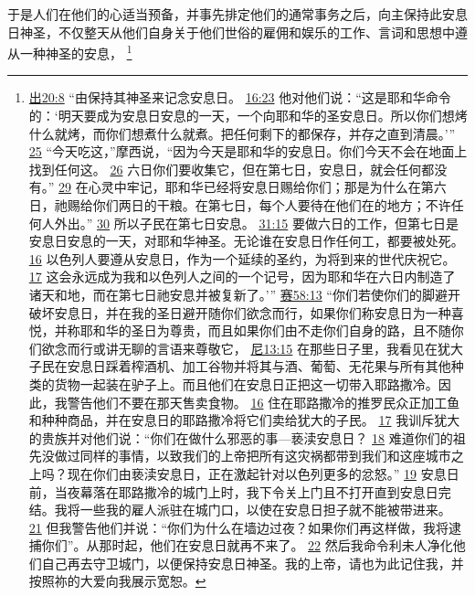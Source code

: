 \documentclass[12pt, a4paper, oneside]{ctexart}
\newcounter{parnum}[section]
\newcommand{\N}{%
   \noindent\refstepcounter{parnum}%
    \makebox[\parindent][l]{\textbf{\arabic{parnum}.}}}
\begin{document}
\N 于是人们在他们的心适当预备，并事先排定他们的通常事务之后，向主保持此安息日神圣，不仅整天从他们自身关于他们世俗的雇佣和娱乐的工作、言词和思想中遵从一种神圣的安息，
	\footnote {
		\href{https://biblehub.com/exodus/20-8.htm}{出20:8} “由保持其神圣来记念安息日。
		\href{https://biblehub.com/exodus/16-23.htm}{16:23} 他对他们说：“这是耶和华命令的：‘明天要成为安息日安息的一天，一个向耶和华的圣安息日。所以你们想烤什么就烤，而你们想煮什么就煮。把任何剩下的都保存，并存之直到清晨。’”
		\href{https://biblehub.com/exodus/16-25.htm}{25} “今天吃这，”摩西说，“因为今天是耶和华的安息日。你们今天不会在地面上找到任何这。
		\href{https://biblehub.com/exodus/16-26.htm}{26} 六日你们要收集它，但在第七日，安息日，就会任何都没有。”
		\href{https://biblehub.com/exodus/16-29.htm}{29} 在心灵中牢记，耶和华已经将安息日赐给你们；那是为什么在第六日，祂赐给你们两日的干粮。在第七日，每个人要待在他们在的地方；不许任何人外出。”
		\href{https://biblehub.com/exodus/16-30.htm}{30} 所以子民在第七日安息。
		\href{https://biblehub.com/exodus/31-15.htm}{31:15} 要做六日的工作，但第七日是安息日安息的一天，对耶和华神圣。无论谁在安息日作任何工，都要被处死。
		\href{https://biblehub.com/exodus/31-16.htm}{16} 以色列人要遵从安息日，作为一个延续的圣约，为将到来的世代庆祝它。
		\href{https://biblehub.com/exodus/31-17.htm}{17} 这会永远成为我和以色列人之间的一个记号，因为耶和华在六日内制造了诸天和地，而在第七日祂安息并被复新了。’”
		\href{https://biblehub.com/isaiah/58-13.htm}{赛58:13} “你们若使你们的脚避开破坏安息日，并在我的圣日避开随你们欲念而行，如果你们称安息日为一种喜悦，并称耶和华的圣日为尊贵，而且如果你们由不走你们自身的路，且不随你们欲念而行或讲无聊的言语来尊敬它，
		\href{https://biblehub.com/nehemiah/13-15.htm}{尼13:15} 在那些日子里，我看见在犹大子民在安息日踩着榨酒机、加工谷物并将其与酒、葡萄、无花果与所有其他种类的货物一起装在驴子上。而且他们在安息日正把这一切带入耶路撒冷。因此，我警告他们不要在那天售卖食物。
		\href{https://biblehub.com/nehemiah/13-16.htm}{16} 住在耶路撒冷的推罗民众正加工鱼和种种商品，并在安息日的耶路撒冷将它们卖给犹大的子民。
		\href{https://biblehub.com/nehemiah/13-17.htm}{17} 我训斥犹大的贵族并对他们说：“你们在做什么邪恶的事---亵渎安息日？
		\href{https://biblehub.com/nehemiah/13-18.htm}{18} 难道你们的祖先没做过同样的事情，以致我们的上帝把所有这灾祸都带到我们和这座城市之上吗？现在你们由亵渎安息日，正在激起针对以色列更多的忿怒。”
		\href{https://biblehub.com/nehemiah/13-19.htm}{19} 安息日前，当夜幕落在耶路撒冷的城门上时，我下令关上门且不打开直到安息日完结。我将一些我的雇人派驻在城门口，以使在安息日担子就不能被带进来。
		\href{https://biblehub.com/nehemiah/13-21.htm}{21} 但我警告他们并说：“你们为什么在墙边过夜？如果你们再这样做，我将逮捕你们”。从那时起，他们在安息日就再不来了。
		\href{https://biblehub.com/nehemiah/13-22.htm}{22} 然后我命令利未人净化他们自己再去守卫城门，以便保持安息日神圣。我的上帝，请也为此记住我，并按照祢的大爱向我展示宽恕。
	}
\end{document}

